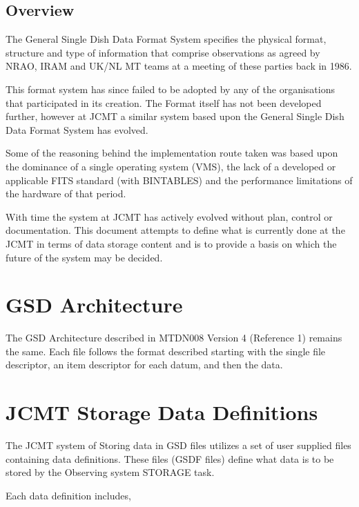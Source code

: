 \subsection{Overview}

  The General Single Dish Data Format System specifies the physical
format, structure and type of information that comprise observations as 
agreed by NRAO, IRAM and UK/NL MT teams at a meeting of these parties
back in 1986.

  This format system has since failed to be adopted by any of the 
organisations that participated in its creation. The Format itself has
not been developed further, however at JCMT a similar system based upon 
the General Single Dish Data Format System has evolved. 

  Some of the reasoning behind the implementation route taken was based 
upon the dominance of a single operating system (VMS), the lack of a 
developed or applicable FITS standard (with BINTABLES) and the performance 
limitations of the hardware of that period.

  With time the system at JCMT has actively evolved without plan, 
control or documentation. This document attempts to define what is currently 
done at the JCMT in terms of data storage content and is to provide a
basis on which the future of the system may be decided.




\section{GSD Architecture}

  The GSD Architecture described in MTDN008 Version 4 (Reference 1)   
remains the same. Each file follows the format described starting with
the single file descriptor, an item descriptor for each datum, and then
the data. 


\section{JCMT Storage Data Definitions}

   The JCMT system of Storing data in GSD files utilizes a set of user
supplied files containing data definitions. These files (GSDF files)
define what data is to be stored by the Observing system STORAGE task.

   Each data definition includes,

